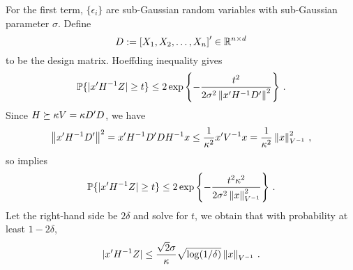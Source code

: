 For the first term, $\{\epsilon_i\}$ are sub-Gaussian random variables with sub-Gaussian parameter $\sigma$.  Define
\[
D := \left[X_1, X_2, \ldots, X_n \right]' \in \mathbb{R}^{n \times d}
\]
to be the design matrix.  Hoeffding inequality gives
\begin{equation}
\mathbb{P}\{|x' H^{-1} Z| \ge t\} \le 2 \exp\left\{-\frac{t^2}{2\sigma^2 \left\|x' H^{-1} D'\right\|^2}\right\}\,.
\label{eqn:first-term-hoeffding}
\end{equation}
Since $H \succeq \kappa V = \kappa D' D$, we have 
\[
\left\|x' H^{-1} D'\right\|^2 = x' H^{-1} D' D H^{-1} x \le \frac{1}{\kappa^2} x' V^{-1} x = \frac{1}{\kappa^2} \left\|x\right\|_{V^{-1}}^2\,,
\]
so  implies
\[
\mathbb{P}\{|x' H^{-1} Z| \ge t\} \le 2 \exp\left\{-\frac{t^2 \kappa^2}{2\sigma^2 \left\|x\right\|_{V^{-1}}^2}\right\}\,.
\]
Let the right-hand side be $2\delta$ and solve for $t$, we obtain that with probability at least $1-2\delta$,
\begin{equation}
|x' H^{-1} Z| \le \frac{\sqrt{2}\sigma}{\kappa} \sqrt{\log(1/\delta)} \left\|x\right\|_{V^{-1}}\,.
\label{eqn:first-term-bound}
\end{equation}

